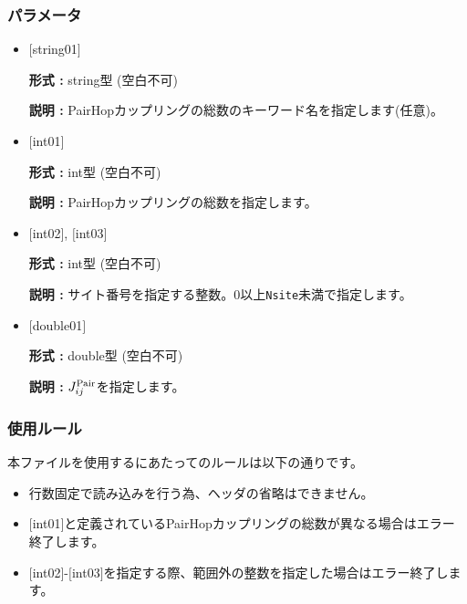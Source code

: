 \subsubsection{パラメータ}
 \begin{itemize}

   \item  $[$string01$]$
   
    {\bf 形式 :} string型 (空白不可)

   {\bf 説明 :} PairHopカップリングの総数のキーワード名を指定します(任意)。

   \item  $[$int01$]$
   
    {\bf 形式 :} int型 (空白不可)

   {\bf 説明 :} PairHopカップリングの総数を指定します。

  \item  $[$int02$]$, $[$int03$]$
  
 {\bf 形式 :} int型 (空白不可)

{\bf 説明 :} サイト番号を指定する整数。0以上\verb|Nsite|{未満}で指定します。
 
 \item  $[$double01$]$
   
   {\bf 形式 :} double型 (空白不可)

  {\bf 説明 :}  $J_{ij}^{\rm Pair}$を指定します。
  
\end{itemize}

\subsubsection{使用ルール}
本ファイルを使用するにあたってのルールは以下の通りです。
\begin{itemize}
\item 行数固定で読み込みを行う為、ヘッダの省略はできません。
\item $[$int01$]$と定義されているPairHopカップリングの総数が異なる場合はエラー終了します。
\item $[$int02$]$-$[$int03$]$を指定する際、範囲外の整数を指定した場合はエラー終了します。
\end{itemize}

\newpage
